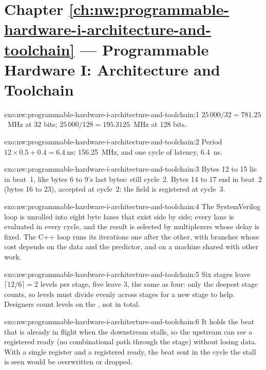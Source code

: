 \section*{Chapter \ref{ch:nw:programmable-hardware-i-architecture-and-toolchain} --- Programmable Hardware I: Architecture and Toolchain}

\begin{solution}{exo:nw:programmable-hardware-i-architecture-and-toolchain:1}
$25\,000/32 = 781.25$~MHz at 32 bits; $25\,000/128 = 195.3125$~MHz at 128 bits.
\end{solution}

\begin{solution}{exo:nw:programmable-hardware-i-architecture-and-toolchain:2}
Period $12 \times 0.5 + 0.4 = \qty{6.4}{\nano\second}$: 156.25~MHz, and one cycle of latency, \qty{6.4}{\nano\second}.
\end{solution}

\begin{solution}{exo:nw:programmable-hardware-i-architecture-and-toolchain:3}
Bytes 12 to 15 lie in beat~1, like bytes 6 to 9's last bytes: still cycle~2. Bytes 14 to 17 end in beat~2 (bytes 16 to 23), accepted at
cycle~2: the field is registered at cycle~3.
\end{solution}

\begin{solution}{exo:nw:programmable-hardware-i-architecture-and-toolchain:4}
The SystemVerilog loop is unrolled into eight byte lanes that exist side by side; every lane is evaluated in every cycle, and the result is
selected by multiplexers whose delay is fixed. The C++ loop runs its iterations one after the other, with branches whose cost depends on
the data and the predictor, and on a machine shared with other work.
\end{solution}

\begin{solution}{exo:nw:programmable-hardware-i-architecture-and-toolchain:5}
Six stages leave $\lceil 12/6\rceil = 2$ levels per stage, five leave 3, the same as four: only the deepest stage counts, so levels must
divide evenly across stages for a new stage to help. Designers count levels on the , not in total.
\end{solution}

\begin{solution}{exo:nw:programmable-hardware-i-architecture-and-toolchain:6}
It holds the beat that is already in flight when the downstream stalls, so the upstream can see a registered ready (no combinational
path through the stage) without losing data. With a single register and a registered ready, the beat sent in the cycle the stall is
seen would be overwritten or dropped.
\end{solution}

